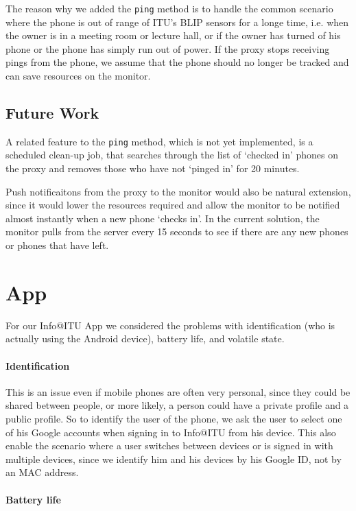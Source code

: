 \documentclass{ubicomp2011}
\begin{document}
The reason why we added the \texttt{ping} method is to handle the common scenario where the phone is out of range of ITU's BLIP sensors for a longe time, i.e. when the owner is in a meeting room or lecture hall, or if the owner has turned of his phone or the phone has simply run out of power. If the proxy stops receiving pings from the phone, we assume that the phone should no longer be tracked and can save resources on the monitor.
\subsection{Future Work}

A related feature to the \texttt{ping} method, which is not yet implemented, is a scheduled clean-up job, that searches through the list of `checked in' phones on the proxy and removes those who have not `pinged in' for 20 minutes.

Push notificaitons from the proxy to the monitor would also be natural extension, since it would lower the resources required and allow the monitor to be notified almost instantly when a new phone `checks in'. In the current solution, the monitor pulls from the server every 15 seconds to see if there are any new phones or phones that have left.

\section{App}

For our Info@ITU App we considered the problems with identification (who is actually using the Android device), battery life, and volatile state.
\paragraph{Identification}

This is an issue even if mobile phones are often very personal, since they could be shared between people, or more likely, a person could have a private profile and a public profile. So to identify the user of the phone, we ask the user to select one of his Google accounts when signing in to Info@ITU from his device. This also enable the scenario where a user switches between devices or is signed in with multiple devices, since we identify him and his devices by his Google ID, not by an MAC address.
\paragraph{Battery life}
\end{document}
